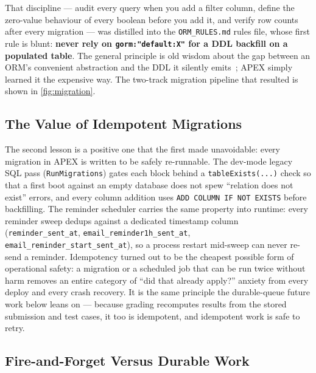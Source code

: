 That discipline --- audit every query when you add a filter column, define the
zero-value behaviour of every boolean before you add it, and verify row counts
after every migration --- was distilled into the \texttt{ORM\_RULES.md} rules
file, whose first rule is blunt: \textbf{never rely on \texttt{gorm:"default:X"}
for a DDL backfill on a populated table}. The general principle is old wisdom
about the gap between an ORM's convenient abstraction and the DDL it silently
emits~\cite{gorm,fowler2002patterns,kleppmann2017ddia}; APEX simply learned it
the expensive way. The two-track migration pipeline that resulted is shown in
\cref{fig:migration}.

\subsection{The Value of Idempotent Migrations}

The second lesson is a positive one that the first made unavoidable: every
migration in APEX is written to be safely re-runnable. The dev-mode legacy SQL
pass (\texttt{RunMigrations}) gates each block behind a \texttt{tableExists(...)}
check so that a first boot against an empty database does not spew ``relation
does not exist'' errors, and every column addition uses
\texttt{ADD COLUMN IF NOT EXISTS} before backfilling. The reminder scheduler
carries the same property into runtime: every reminder sweep dedups against a
dedicated timestamp column (\texttt{reminder\_sent\_at},
\texttt{email\_reminder1h\_sent\_at}, \texttt{email\_reminder\_start\_sent\_at}),
so a process restart mid-sweep can never re-send a reminder. Idempotency turned
out to be the cheapest possible form of operational safety: a migration or a
scheduled job that can be run twice without harm removes an entire category of
``did that already apply?'' anxiety from every deploy and every crash recovery.
It is the same principle the durable-queue future work below leans on ---
because grading recomputes results from the stored submission and test cases, it
too is idempotent, and idempotent work is safe to retry.

\subsection{Fire-and-Forget Versus Durable Work}

